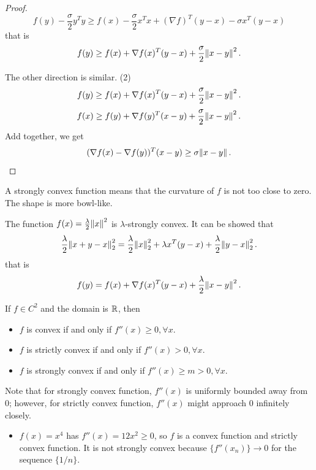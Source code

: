 \begin{refsection}
\begin{proof}
$$f(y) - \frac{\sigma}{2}y^Ty \geq f(x) - \frac{\sigma}{2}x^Tx + (\nabla f)^T(y-x) - \sigma x^T(y-x)$$
that is
$$f(y) \geq f(x) + \nabla f(x)^T(y-x) + \frac{\sigma}{2}\norm{x-y}^2.$$

The other direction is similar.
(2) 
$$f(y) \geq f(x) + \nabla f(x)^T(y-x) + \frac{\sigma}{2}\norm{x-y}^2.$$
$$f(x) \geq f(y) + \nabla f(y)^T(x-y) + \frac{\sigma}{2}\norm{x-y}^2.$$
Add together, we get
$$(\nabla f(x) - \nabla f(y))^T(x - y) \geq \sigma \norm{x - y}.$$
\end{proof}

\begin{remark}[interpretation]
A strongly convex function means that the curvature of $f$ is not too close to zero. The shape is more bowl-like.
\end{remark}

\begin{example}
The function $f(x) = \frac{\lambda}{2}\norm{x}^2$ is $\lambda$-strongly convex. 
It can be showed that
$$\frac{\lambda}{2}\norm{x + y - x}_2^2 = \frac{\lambda}{2}\norm{x}_2^2 + \lambda x^T(y-x) + \frac{\lambda}{2}\norm{y-x}_2^2.$$
that is
$$f(y) = f(x) +  \nabla f(x)^T(y-x) + \frac{\lambda}{2}\norm{x-y}^2.$$
\end{example}





\begin{note}
If $f \in C^2$ and the domain is $\mathbb{R}$, then
\begin{itemize}
	\item $f$ is convex if and only if $f''(x) \geq 0, \forall x$.
	\item $f$ is strictly convex if and only if $f''(x) > 0, \forall x$.
	\item $f$ is strongly convex if and only if $f''(x) \geq m > 0, \forall x$. 
\end{itemize} 
Note that for strongly convex function, $f''(x)$ is uniformly bounded away from 0; however, for strictly convex function, $f''(x)$ might approach 0 infinitely closely.  
\end{note}



\begin{example}\hfill
\begin{itemize}
	\item $f(x) = x^4$ has $f''(x) = 12x^2 \geq 0$, so $f$ is a convex function and strictly convex function. It is not strongly convex because $\{f''(x_n)\} \to 0$ for the sequence $\{1/n\}$.
	  

\end{itemize}
\end{example}
\end{refsection}
